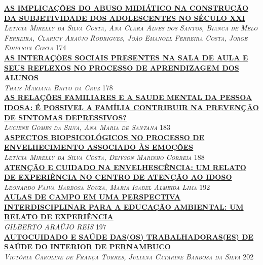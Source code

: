 \noindent \textsc{\hyperlink{trabalhos/241367.pdf.1}{\textbf{AS IMPLICAÇÕES DO ABUSO MIDIÁTICO NA CONSTRUÇÃO DA SUBJETIVIDADE DOS ADOLESCENTES NO SÉCULO XXI}}}\\ 
\noindent \textsc{\textit{Letícia Mirelly da Silva Costa, Ana Clara Alves dos Santos, Bianca de Melo Ferreira, Claricy Araújo Rodrigues, João Emanoel Ferreira Costa, Jorge Edielson Costa}} \hfill 174\\ 

\noindent \textsc{\hyperlink{trabalhos/250221.pdf.1}{\textbf{AS INTERAÇÕES SOCIAIS PRESENTES NA SALA DE AULA E SEUS REFLEXOS NO PROCESSO DE APRENDIZAGEM DOS ALUNOS}}}\\ 
\noindent \textsc{\textit{Thais Mariana Brito da Cruz}} \hfill 178\\ 

\noindent \textsc{\hyperlink{trabalhos/250140.pdf.1}{\textbf{AS RELAÇÕES FAMILIARES E A SAUDE MENTAL DA PESSOA IDOSA: É POSSIVEL A FAMÍLIA CONTRIBUIR NA PREVENÇÃO DE SINTOMAS DEPRESSIVOS?}}}\\ 
\noindent \textsc{\textit{Luciene Gomes da Silva, Ana Maria de Santana}} \hfill 183\\ 

\noindent \textsc{\hyperlink{trabalhos/243499.pdf.1}{\textbf{ASPECTOS BIOPSICOLÓGICOS NO PROCESSO DE ENVELHECIMENTO ASSOCIADO ÀS EMOÇÕES}}}\\ 
\noindent \textsc{\textit{Letícia Mirelly da Silva Costa, Deivson Marinho Correia}} \hfill 188\\ 

\noindent \textsc{\hyperlink{trabalhos/251300.pdf.1}{\textbf{ATENÇÃO E CUIDADO NA ENVELHESCÊNCIA: UM RELATO DE EXPERIÊNCIA NO CENTRO DE ATENÇÃO AO IDOSO}}}\\ 
\noindent \textsc{\textit{Leonardo Paiva Barbosa Souza, Maria Isabel Almeida Lima}} \hfill 192\\ 

\noindent \textsc{\hyperlink{trabalhos/250363.pdf.1}{\textbf{AULAS DE CAMPO EM UMA PERSPECTIVA INTERDISCIPLINAR PARA A EDUCAÇÃO AMBIENTAL:  UM RELATO DE EXPERIÊNCIA}}}\\ 
\noindent \textsc{\textit{GILBERTO ARAÚJO REIS}} \hfill 197\\ 

\noindent \textsc{\hyperlink{trabalhos/249983.pdf.1}{\textbf{AUTOCUIDADO E SAÚDE DAS(OS) TRABALHADORAS(ES) DE SAÚDE DO INTERIOR DE PERNAMBUCO}}}\\ 
\noindent \textsc{\textit{Victória Caroline de França Torres, Juliana Catarine Barbosa da Silva}} \hfill 202\\ 

